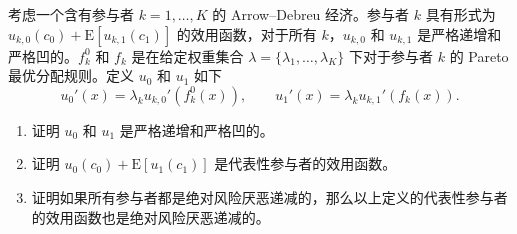 \par\noindent\begin{minipage}{\linewidth}
\begin{problem}
 考虑一个含有参与者 $k=1,\dots,K$ 的 Arrow--Debreu 经济。参与者 $k$ 具有形式为 $u_{k,0}(c_{0})+\mathrm{E}[u_{k,1}(c_{1})]$ 的效用函数，对于所有 $k$，$u_{k,0}$ 和 $u_{k,1}$ 是严格递增和严格凹的。$f_{k}^{0}$ 和 $f_{k}$ 是在给定权重集合 $\lambda=\{\lambda_{1},\dots,\lambda_{K}\}$ 下对于参与者 $k$ 的 Pareto 最优分配规则。定义 $u_{0}$ 和 $u_{1}$ 如下
\[
    u_{0}'(x)=\lambda_{k}u_{k,0}'(f_{k}^{0}(x)),\qquad u_{1}'(x)=\lambda_{k}u_{k,1}'(f_{k}(x)).
\]
\begin{enumerate}[label=(\alph*)]
    \item 证明 $u_{0}$ 和 $u_{1}$ 是严格递增和严格凹的。
    \item 证明 $u_{0}(c_{0})+\mathrm{E}[u_{1}(c_{1})]$ 是代表性参与者的效用函数。
    \item 证明如果所有参与者都是绝对风险厌恶递减的，那么以上定义的代表性参与者的效用函数也是绝对风险厌恶递减的。
\end{enumerate}
\end{problem}
\end{minipage}\par
{}
